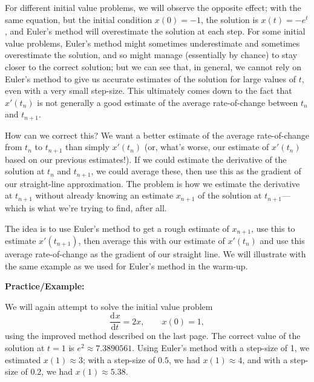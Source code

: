 \documentclass{article}
\newcommand{\deriv}[3][]{\frac{\mathrm{d}^{#1}#2}{\mathrm{d}#3^{#1}}}
\begin{document}
For different initial value problems, we will observe the opposite effect; with the same equation, but the initial condition $x(0)=-1$, the solution is $x(t)=-e^t$, and Euler's method will overestimate the solution at each step. For some initial value problems, Euler's method might sometimes underestimate and sometimes overestimate the solution, and so might manage (essentially by chance) to stay closer to the correct solution; but we can see that, in general, we cannot rely on Euler's method to give us accurate estimates of the solution for large values of $t$, even with a very small step-size. This ultimately comes down to the fact that $x'(t_n)$ is not generally a good estimate of the average rate-of-change between $t_n$ and $t_{n+1}$.

How can we correct this? We want a better estimate of the average rate-of-change from $t_n$ to $t_{n+1}$ than simply $x'(t_n)$ (or, what's worse, our estimate of $x'(t_n)$ based on our previous estimates!). If we could estimate the derivative of the solution at $t_n$ and $t_{n+1}$, we could average these, then use this as the gradient of our straight-line approximation. The problem is how we estimate the derivative at $t_{n+1}$ without already knowing an estimate $x_{n+1}$ of the solution at $t_{n+1}$---which is what we're trying to find, after all.

The idea is to use Euler's method to get a rough estimate of $x_{n+1}$, use this to estimate $x'(t_{n+1})$, then average this with our estimate of $x'(t_n)$ and use this average rate-of-change as the gradient of our straight line. We will illustrate with the same example as we used for Euler's method in the warm-up.






\clearpage





\textbf{Practice/Example:}

\vspace{5mm}

We will again attempt to solve the initial value problem
\[\deriv{x}{t}=2x,\qquad x(0)=1,\]
using the improved method described on the last page.
The correct value of the solution at $t=1$ is $e^2\approx 7.3890561$. Using Euler's method with a step-size of 1, we estimated $x(1)\approx 3$; with a step-size of $0.5$, we had $x(1)\approx 4$, and with a step-size of $0.2$, we had $x(1)\approx 5.38$.
\end{document}
